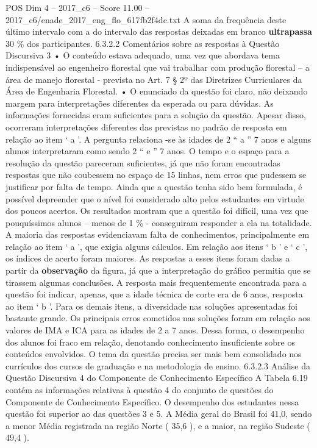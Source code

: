 \begin{textsample}{POS Dim 4 – 2017\_c6 – Score 11.00 – 2017\_c6/enade\_2017\_eng\_flo\_617fb2f4dc.txt}
A soma da frequência deste último intervalo com a do intervalo das respostas deixadas em branco \textbf{ultrapassa} 30 \% dos participantes. 6.3.2.2 Comentários sobre as respostas à Questão Discursiva 3 • O conteúdo estava adequado, uma vez que abordava tema indispensável ao engenheiro florestal que vai trabalhar com produção florestal – a área de manejo florestal - prevista no Art. 7 § 2º das Diretrizes Curriculares da Área de Engenharia Florestal. • O enunciado da questão foi claro, não deixando margem para interpretações diferentes da esperada ou para dúvidas.
As informações fornecidas eram suficientes para a solução da questão.
Apesar disso, ocorreram interpretações diferentes das previstas no padrão de resposta em relação ao item ‘ a ’.
A pergunta relaciona -se às idades de 2 “ a ” 7 anos e alguns alunos interpretaram como sendo 2 “ e ” 7 anos.
O tempo e o espaço para a resolução da questão pareceram suficientes, já que não foram encontradas respostas que não coubessem no espaço de 15 linhas, nem erros que pudessem se justificar por falta de tempo.
Ainda que a questão tenha sido bem formulada, é possível depreender que o nível foi considerado alto pelos estudantes em virtude dos poucos acertos.
Os resultados mostram que a questão foi difícil, uma vez que pouquíssimos alunos – menos de 1 \% - conseguiram responder a ela na totalidade.
A maioria das respostas evidenciavam falta de conhecimentos, principalmente em relação ao item ‘ a ’, que exigia alguns cálculos.
Em relação aos itens ‘ b ’ e ‘ c ’, os índices de acerto foram maiores.
As respostas a esses itens foram dadas a partir da \textbf{observação} da figura, já que a interpretação do gráfico permitia que se tirassem algumas conclusões.
A resposta mais frequentemente encontrada para a questão foi indicar, apenas, que a idade técnica de corte era de 6 anos, resposta ao item ‘ b ’.
Para os demais itens, a diversidade nas soluções apresentadas foi bastante grande.
Os principais erros cometidos nas soluções foram em relação aos valores de IMA e ICA para as idades de 2 a 7 anos.
Dessa forma, o desempenho dos alunos foi fraco em relação, denotando conhecimento insuficiente sobre os conteúdos envolvidos.
O tema da questão precisa ser mais bem consolidado nos currículos dos cursos de graduação e na metodologia de ensino. 6.3.2.3 Análise da Questão Discursiva 4 do Componente de Conhecimento Específico A Tabela 6.19 contém as informações relativas à questão 4 do conjunto de questões do Componente de Conhecimento Específico.
O desempenho dos estudantes nessa questão foi superior ao das questões 3 e 5.
A Média geral do Brasil foi 41,0, sendo a menor Média registrada na região Norte ( 35,6 ), e a maior, na região Sudeste ( 49,4 ).

\end{textsample}
